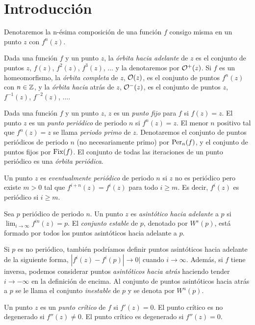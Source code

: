 \chapter{Introducción}


Denotaremos la n-ésima composición de una función $f$ consigo misma en un punto
$z$ con $f^n(z)$.

\begin{definicion}
  Dada una función $f$ y un punto $z$, la \emph{órbita hacia adelante} de $z$
  es el conjunto de puntos $z$, $f(z)$, $f^2(z)$, $f^3(z)$, $\ldots$ y la
  denotaremos por $\mathcal{O}^+(z)$. Si $f$ es un homeomorfismo, la \emph{órbita
  completa} de $z$, $\mathcal{O}(z)$, es el conjunto de puntos $f^n(z)$ con $n \in
  \mathbb{Z}$, y la \emph{órbita hacia} atrás de $z$, $\mathcal{O}^-(z)$, es el conjunto de
  puntos $z$, $f^{-1}(z)$, $f^{-2}(z)$, $\ldots$.
\end{definicion}

\begin{definicion}
  Dada una función $f$ y un punto $z$, $z$ es un \emph{punto fijo} para $f$ si
  $f(z) = z$. El punto $z$ es un \emph{punto periódico} de periodo $n$ si
  $f^n(z) = z$. El menor $n$ positivo tal que $f^n(z) = z$ se llama
  \emph{periodo primo} de $z$. Denotaremos el conjunto de puntos periódicos de
  periodo $n$ (no necesariamente primo) por $\mathrm{Per}_{n}(f)$, y el
  conjunto de puntos fijos por $\mathrm{Fix}(f)$. El conjunto de todas las
  iteraciones de un punto periódico es una \emph{órbita periódica}.
\end{definicion}

\begin{definicion}
  Un punto $z$ es \emph{eventualmente periódico} de periodo $n$ si $z$ no es
  periódico pero existe $m > 0$ tal que $f^{i+n}(z) = f^i(z)$ para todo $i \geq
  m$. Es decir, $f^i(z)$ es periódico si $i \geq m$.
\end{definicion}

\begin{definicion}
  Sea $p$ periódico de periodo $n$. Un punto $z$ es \emph{asintótico hacia
  adelante} a $p$ si $\lim_{i \to \infty} f^{in}(z) = p$. El \emph{conjunto
  estable} de $p$, denotado por $W^s(p)$, está formado por todos los puntos
  asintóticos hacia adelante a $p$.
\end{definicion}

Si $p$ es no periódico, también podríamos definir puntos asintóticos hacia
adelante de la siguiente forma, $|f^i(z) - f^i(p)| \to 0|$ cuando $i \to
\infty$. Además, si $f$ tiene inversa, podemos considerar puntos
\emph{asintóticos hacia atrás} haciendo tender $i \to -\infty$ en la definición
de encima. Al conjunto de puntos asintóticos hacia atrás a $p$ se le llama el
conjunto \emph{inestable} de $p$ y se denota por $W^u(p)$.

\begin{definicion}
  Un punto $z$ es un \emph{punto crítico} de $f$ si $f'(z) = 0$. El punto
  crítico es no degenerado si $f''(z) \neq 0$. El punto crítico es degenerado
  si $f''(z) = 0$.
\end{definicion}
